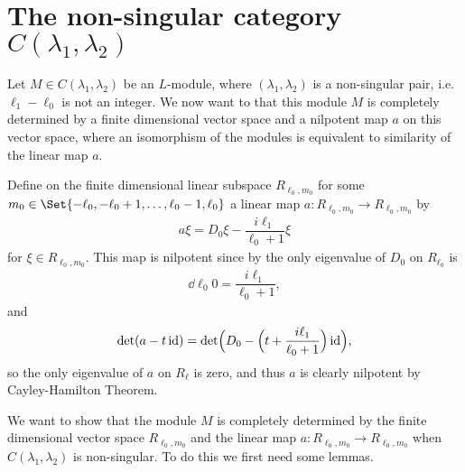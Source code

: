 \section{\texorpdfstring{The non-singular category $C(\lambda_1,\lambda_2)$}{The non-singular category C(lambda\_1,lambda\_2)}}

Let $M\in C(\lambda_1,\lambda_2)$ be an $L$-module, where $(\lambda_1,\lambda_2)$ is a non-singular pair, i.e.\ $\ell_1-\ell_0$ is not an integer. We now want to that this module $M$ is completely determined by a finite dimensional vector space and a nilpotent map $a$ on this vector space, where an isomorphism of the modules is equivalent to similarity of the linear map $a$.

Define on the finite dimensional linear subspace $R_{\ell_0,m_0}$ for some $m_0\in \Set{-\ell_0,-\ell_0+1,\dotsc,\ell_0-1,\ell_0}$ a linear map $a\colon R_{\ell_0,m_0}\to R_{\ell_0,m_0}$ by
\begin{align}\label{eq:adef}
  a\xi = D_0\xi - \dfrac{i\ell_1}{\ell_0+1}\xi
\end{align}
for $\xi\in R_{\ell_0,m_0}$. This map is nilpotent since by  the only eigenvalue of $D_0$ on $R_{\ell_0}$ is
\begin{align*}
  \dd{\ell_0}{0} = \dfrac{i\ell_1}{\ell_0+1},
\end{align*}
and
\begin{align*}
  \det(a-t\operatorname{id}) = \det\Bigl( D_0 - \Bigl(t+\dfrac{i\ell_1}{\ell_0+1} \Bigr)\operatorname{id} \Bigr),
\end{align*}
so the only eigenvalue of $a$ on $R_\ell$ is zero, and thus $a$ is clearly nilpotent by Cayley-Hamilton Theorem.

We want to show that the module $M$ is completely determined by the finite dimensional vector space $R_{\ell_0,m_0}$ and the linear map $a\colon R_{\ell_0,m_0}\to R_{\ell_0,m_0}$ when $C(\lambda_1,\lambda_2)$ is non-singular. To do this we first need some lemmas.

